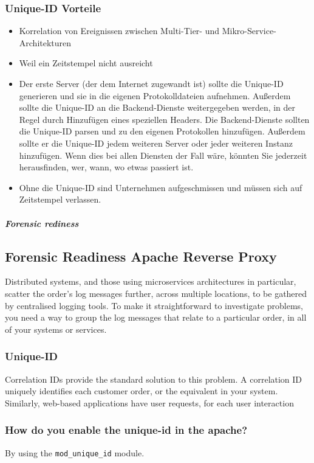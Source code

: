 \subsubsection{Unique-ID Vorteile}
\begin{itemize}
    \item Korrelation von Ereignissen zwischen Multi-Tier- und Mikro-Service-Architekturen
    \item Weil ein Zeitstempel nicht ausreicht
    \item Der erste Server (der dem Internet zugewandt ist) sollte die Unique-ID generieren und sie in die eigenen Protokolldateien aufnehmen. Außerdem sollte die Unique-ID an die Backend-Dienste weitergegeben werden, in der Regel durch Hinzufügen eines speziellen Headers. Die Backend-Dienste sollten die Unique-ID parsen und zu den eigenen Protokollen hinzufügen. Außerdem sollte er die Unique-ID jedem weiteren Server oder jeder weiteren Instanz hinzufügen. Wenn dies bei allen Diensten der Fall wäre, könnten Sie jederzeit herausfinden, wer, wann, wo etwas passiert ist.
    \item Ohne die Unique-ID sind Unternehmen aufgeschmissen und müssen sich auf Zeitstempel verlassen.
\end{itemize}


\subparagraph{Forensic rediness}

\subsection{Forensic Readiness Apache Reverse Proxy}
Distributed systems, and those using microservices architectures in particular, scatter the order's log messages further, across multiple locations, to be gathered by centralised logging tools. To make it straightforward to investigate problems, you need a way to group the log messages that relate to a particular order, in all of your systems or services.

\subsubsection{Unique-ID}
Correlation IDs provide the standard solution to this problem. A correlation ID uniquely identifies each \glqq customer order\grqq, or the equivalent in your system. Similarly, web-based applications have \glqq user requests\grqq, for each user interaction

\subsubsection{How do you enable the unique-id in the apache?}
By using the \lstinline|mod_unique_id| module.

